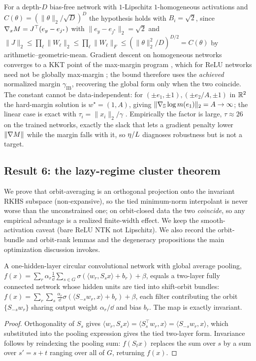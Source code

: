 \begin{remark}\label{rem:envelope-scope}
For a depth-$D$ bias-free network with $1$-Lipschitz $1$-homogeneous activations
and $C(\theta)=(\lVert\theta\rVert_2/\sqrt D)^D$ the hypothesis holds with
$B_i=\sqrt2$, since $\nabla_xM=J^\top(e_y-e_{j^\star})$ with
$\lVert e_y-e_{j^\star}\rVert_2=\sqrt2$ and
$\lVert J\rVert_2\le\prod_\ell\lVert W_\ell\rVert_2\le\prod_\ell\lVert W_\ell\rVert_F\le(\lVert\theta\rVert_2^2/D)^{D/2}=C(\theta)$
by arithmetic--geometric-mean. Gradient descent on homogeneous networks
converges to a KKT point of the max-margin program
\citep{lyu2020gradient,ji2020directional}, which for ReLU networks need not be
globally max-margin \citep{vardi2022margin}; the bound therefore uses the
\emph{achieved} normalized margin $\gamma_{\mathrm{IB}}$, recovering the global
form only when the two coincide. The constant cannot be data-independent: for
$(\pm e_1,\pm1),(\pm e_2/A,\pm1)$ in $\mathbb{R}^2$ the hard-margin solution is
$w^\star=(1,A)$, giving $\lVert\nabla_{\mathbb S}\log m(e_1)\rVert_2=A\to\infty$;
the linear case is exact with $\tau_i=\lVert x_i\rVert_2/\gamma$
\citep{soudry2018implicit}. Empirically the factor is large, $\tau\approx26$ on
the trained networks, exactly the slack that lets a gradient penalty lower
$\lVert\nabla M\rVert$ while the margin falls with it, so $\eta/L$ diagnoses
robustness but is not a target.
\end{remark}

\subsection{Result 6: the lazy-regime cluster theorem}\label{app:ft-lazy}
We prove that orbit-averaging is an orthogonal projection onto the invariant
RKHS subspace (non-expansive), so the tied minimum-norm interpolant is never
worse than the unconstrained one; on orbit-closed data the two \emph{coincide},
so any empirical advantage is a realized finite-width effect. We keep the
smooth-activation caveat (bare ReLU NTK not Lipschitz). We also record the
orbit-bundle and orbit-rank lemmas and the degeneracy propositions the main
optimization discussion invokes.

\begin{lemma}\label{lem:bundle-app}
A one-hidden-layer circular convolutional network with global average pooling,
$f(x)=\sum_r\alpha_r\tfrac1\dd\sum_{s\in G}\sigma(\langle w_r,S_sx\rangle+b_r)+\beta$,
equals a two-layer fully connected network whose hidden units are tied into
shift-orbit bundles: $f(x)=\sum_r\sum_s\tfrac{\alpha_r}\dd\sigma(\langle S_{-s}w_r,x\rangle+b_r)+\beta$,
each filter contributing the orbit $\{S_{-s}w_r\}$ sharing output weight
$\alpha_r/\dd$ and bias $b_r$. The map is exactly invariant.
\end{lemma}
\begin{proof}
Orthogonality of $S_s$ gives
$\langle w_r,S_sx\rangle=\langle S_s^\top w_r,x\rangle=\langle S_{-s}w_r,x\rangle$,
which substituted into the pooling expression gives the tied two-layer form.
Invariance follows by reindexing the pooling sum: $f(S_tx)$ replaces the sum over
$s$ by a sum over $s'=s+t$ ranging over all of $G$, returning $f(x)$.
\end{proof}

